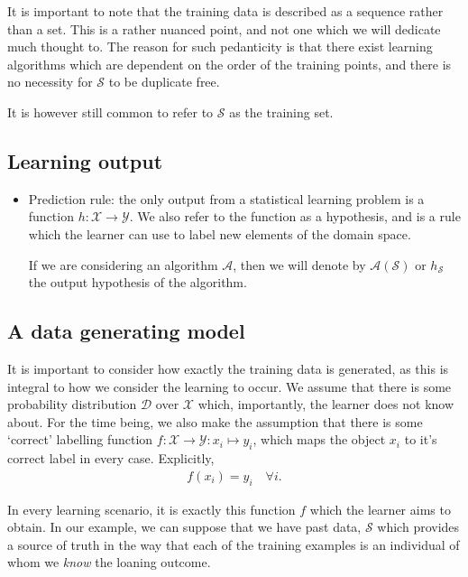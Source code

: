 \begin{remark}
	It is important to note that the training data is described as a sequence rather than a set. This is a rather nuanced point, and not one which we will dedicate much thought to. The reason for such pedanticity is that there exist learning algorithms which are dependent on the order of the training points, and there is no necessity for $ \mathcal{S} $ to be duplicate free.

	It is however still common to refer to $ \mathcal{S} $ as the training set.
\end{remark}

\subsection{Learning output}
\begin{itemize}
	\item Prediction rule: the only output from a statistical learning problem is a function $ h: \mathcal{X} \to \mathcal{Y} $. We also refer to the function as a hypothesis, and is a rule which the learner can use to label new elements of the domain space.

	      If we are considering an algorithm $ \mathcal{A} $, then we will denote by $ \mathcal{A}( \mathcal{S} ) $ or $ h_{\mathcal{S}} $ the output hypothesis of the algorithm.
\end{itemize}

\subsection{A data generating model}
It is important to consider how exactly the training data is generated, as this is integral to how we consider the learning to occur. We assume that there is some probability distribution $ \mathcal{D} $ over $ \mathcal{X} $ which, importantly, the learner does not know about. For the time being, we also make the assumption that there is some `correct' labelling function $ f: \mathcal{X} \to \mathcal{Y}: x_{i} \mapsto y_{i} $, which maps the object $ x_{i} $ to it's correct label in every case. Explicitly,
\begin{align*}
	f ( x_{i} ) = y_{i} \quad \forall i.
\end{align*}

In every learning scenario, it is exactly this function $ f $ which the learner aims to obtain. In our example, we can suppose that we have past data, $ \mathcal{S} $ which provides a source of truth in the way that each of the training examples is an individual of whom we \textit{know} the loaning outcome.


